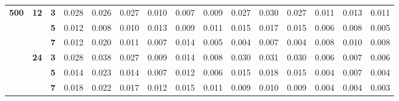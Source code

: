 \documentclass[a4paper,man,natbib]{apa6}
\begin{document}
\begin{table}[]
{\begin{tabular}{ccccccccccccccc}
			\multirow{6}{*}{\textbf{500}} & \multirow{3}{*}{\textbf{12}} & \textbf{3} & 0.028 & 0.026 & 0.027 & 0.010 & 0.007 & 0.009 & 0.027  & 0.030 & 0.027 & 0.011 & 0.013 & 0.011 \\ \cline{3-15} 
			&                              & \textbf{5} & 0.012 & 0.008 & 0.010 & 0.013 & 0.009 & 0.011 & 0.015  & 0.017 & 0.015 & 0.006 & 0.008 & 0.005 \\ \cline{3-15} 
			&                              & \textbf{7} & 0.012 & 0.020 & 0.011 & 0.007 & 0.014 & 0.005 & 0.004  & 0.007 & 0.004 & 0.008 & 0.010 & 0.008 \\ \cline{2-15} 
			& \multirow{3}{*}{\textbf{24}} & \textbf{3} & 0.028 & 0.038 & 0.027 & 0.009 & 0.014 & 0.008 & 0.030  & 0.031 & 0.030 & 0.006 & 0.007 & 0.006 \\ \cline{3-15} 
			&                              & \textbf{5} & 0.014 & 0.023 & 0.014 & 0.007 & 0.012 & 0.006 & 0.015  & 0.018 & 0.015 & 0.004 & 0.007 & 0.004 \\ \cline{3-15} 
			&                              & \textbf{7} & 0.018 & 0.022 & 0.017 & 0.012 & 0.015 & 0.011 & 0.009  & 0.010 & 0.009 & 0.004 & 0.004 & 0.003 \\ \hline
		\end{tabular}%
	}
\end{table}
\end{document}
